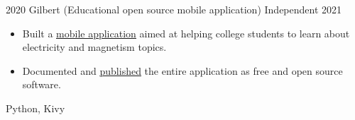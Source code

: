 \begin{projects}
%

    \emptySeparator

    \project
        {2020}
        {Gilbert (Educational open source mobile application)}
        {Independent}
        {2021}
        {
            \begin{itemize}
                \item Built a \href{https://github.com/alanverdugo/gilbert/}{\underline{mobile application}}
                    aimed at helping college students to learn about electricity
                    and magnetism topics.
                \item Documented and
                    \href{https://play.google.com/store/apps/details?id=net.kippel.gilbert/}
                    {\underline{published}} the entire application as free and open
                    source software.
            \end{itemize}
        }
        {
            Python,
            Kivy
        }



\end{projects}
